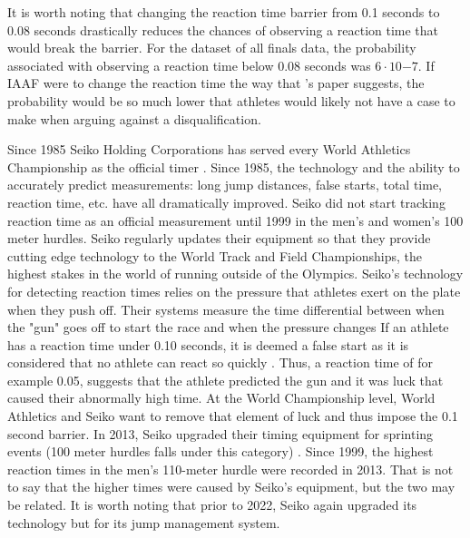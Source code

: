 \documentclass[12pt, letterpaper, titlepage]{article}
\begin{document}
It is worth noting that changing the reaction time barrier from 0.1 seconds to
0.08 seconds drastically reduces the chances of observing a reaction time that
would break the barrier.  For the dataset of all finals data, the probability
associated with observing a reaction time below 0.08 seconds was $6\cdot10{-7}$.
If IAAF were to change the reaction time the way that \citet{Komi}'s paper
suggests, the probability would be so much lower that athletes would likely not
have a case to make when arguing against a disqualification.


Since 1985 Seiko Holding Corporations has served every World Athletics Championship
as the official timer \citep{Seiko}.  Since 1985, the technology and the ability
to accurately predict measurements: long jump distances, false starts, total time,
reaction time, etc. have all dramatically improved.  Seiko did not start tracking
reaction time as an official measurement until 1999 in the men's and women's 100 meter
hurdles.  Seiko regularly updates their equipment so that they provide cutting edge
technology to the World Track and Field Championships, the highest stakes in the world
of running outside of the Olympics. Seiko's technology for detecting reaction 
times relies on the pressure that athletes
exert on the plate when they push off.  Their systems measure the time differential
between when the "gun" goes off to start the race and when the pressure changes 
\citep{Seiko}  If an athlete has a reaction time under 0.10 seconds, it is deemed a 
false start as it is considered that no athlete can react so quickly 
\citep{Seiko-Timing}.  Thus, a reaction time of for example 0.05, suggests that 
the athlete predicted the gun and it was luck that caused their abnormally high 
time.  At the World Championship level, World Athletics and Seiko want to remove 
that element of luck and thus impose the 0.1 second barrier. In 2013, Seiko 
upgraded their timing equipment for sprinting events (100 meter hurdles falls 
under this category) \citep{WorldAthletics_2013}.  Since 1999, the highest reaction 
times in the men's 110-meter hurdle were recorded in 2013.  That is not to say that the higher 
times were caused by Seiko's equipment, but the two may be related.  It is worth noting that prior
to 2022, Seiko again upgraded its technology but for its jump management system.
\end{document}
